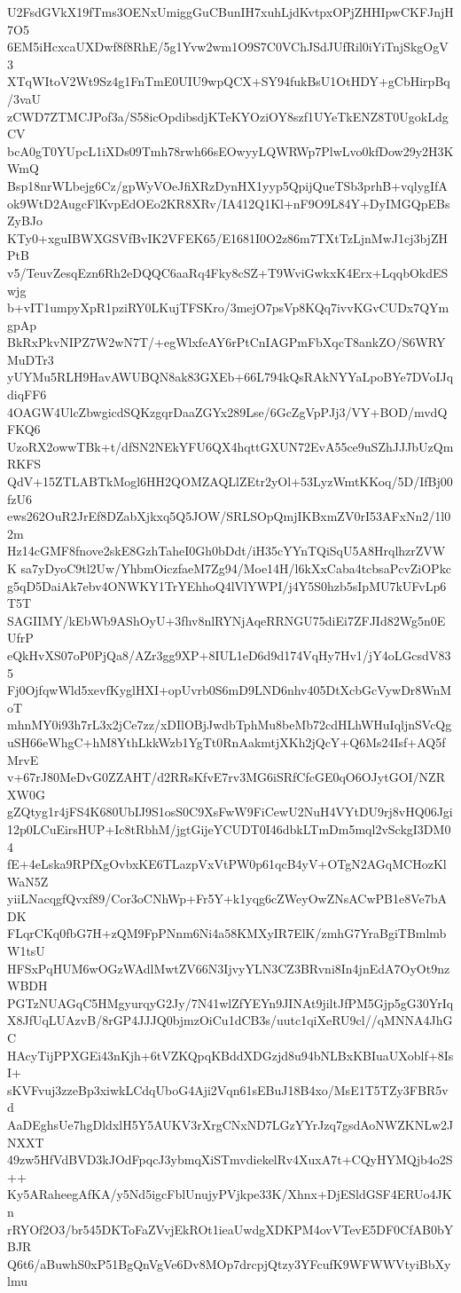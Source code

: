 U2FsdGVkX19fTms3OENxUmiggGuCBunIH7xuhLjdKvtpxOPjZHHIpwCKFJnjH7O5
6EM5iHcxcaUXDwf8f8RhE/5g1Yvw2wm1O9S7C0VChJSdJUfRil0iYiTnjSkgOgV3
XTqWItoV2Wt9Sz4g1FnTmE0UIU9wpQCX+SY94fukBsU1OtHDY+gCbHirpBq/3vaU
zCWD7ZTMCJPof3a/S58icOpdibsdjKTeKYOziOY8szf1UYeTkENZ8T0UgokLdgCV
bcA0gT0YUpcL1iXDs09Tmh78rwh66sEOwyyLQWRWp7PlwLvo0kfDow29y2H3KWmQ
Bsp18nrWLbejg6Cz/gpWyVOeJfiXRzDynHX1yyp5QpijQueTSb3prhB+vqlygIfA
ok9WtD2AugcFlKvpEdOEo2KR8XRv/IA412Q1Kl+nF9O9L84Y+DyIMGQpEBsZyBJo
KTy0+xguIBWXGSVfBvIK2VFEK65/E1681I0O2z86m7TXtTzLjnMwJ1cj3bjZHPtB
v5/TeuvZesqEzn6Rh2eDQQC6aaRq4Fky8cSZ+T9WviGwkxK4Erx+LqqbOkdESwjg
b+vIT1umpyXpR1pziRY0LKujTFSKro/3mejO7psVp8KQq7ivvKGvCUDx7QYmgpAp
BkRxPkvNIPZ7W2wN7T/+egWlxfeAY6rPtCnIAGPmFbXqcT8ankZO/S6WRYMuDTr3
yUYMu5RLH9HavAWUBQN8ak83GXEb+66L794kQsRAkNYYaLpoBYe7DVoIJqdiqFF6
4OAGW4UlcZbwgicdSQKzgqrDaaZGYx289Lse/6GcZgVpPJj3/VY+BOD/mvdQFKQ6
UzoRX2owwTBk+t/dfSN2NEkYFU6QX4hqttGXUN72EvA55ce9uSZhJJJbUzQmRKFS
QdV+15ZTLABTkMogl6HH2QOMZAQLlZEtr2yOl+53LyzWmtKKoq/5D/IfBj00fzU6
ews262OuR2JrEf8DZabXjkxq5Q5JOW/SRLSOpQmjIKBxmZV0rI53AFxNn2/1l02m
Hz14cGMF8fnove2skE8GzhTaheI0Gh0bDdt/iH35cYYnTQiSqU5A8HrqlhzrZVWK
sa7yDyoC9tl2Uw/YhbmOiczfaeM7Zg94/Moe14H/l6kXxCaba4tcbsaPcvZiOPkc
g5qD5DaiAk7ebv4ONWKY1TrYEhhoQ4lVlYWPI/j4Y5S0hzb5sIpMU7kUFvLp6T5T
SAGIIMY/kEbWb9AShOyU+3fhv8nlRYNjAqeRRNGU75diEi7ZFJId82Wg5n0EUfrP
eQkHvXS07oP0PjQa8/AZr3gg9XP+8IUL1eD6d9d174VqHy7Hv1/jY4oLGcsdV835
Fj0OjfqwWld5xevfKyglHXI+opUvrb0S6mD9LND6nhv405DtXcbGcVywDr8WnMoT
mhnMY0i93h7rL3x2jCe7zz/xDIlOBjJwdbTphMu8beMb72cdHLhWHuIqljnSVcQg
uSH66eWhgC+hM8YthLkkWzb1YgTt0RnAakmtjXKh2jQcY+Q6Ms24Isf+AQ5fMrvE
v+67rJ80MeDvG0ZZAHT/d2RRsKfvE7rv3MG6iSRfCfcGE0qO6OJytGOI/NZRXW0G
gZQtyg1r4jFS4K680UbIJ9S1osS0C9XsFwW9FiCewU2NuH4VYtDU9rj8vHQ06Jgi
12p0LCuEirsHUP+Ic8tRbhM/jgtGijeYCUDT0I46dbkLTmDm5mql2vSckgI3DM04
fE+4eLska9RPfXgOvbxKE6TLazpVxVtPW0p61qcB4yV+OTgN2AGqMCHozKlWaN5Z
yiiLNacqgfQvxf89/Cor3oCNhWp+Fr5Y+k1yqg6cZWeyOwZNsACwPB1e8Ve7bADK
FLqrCKq0fbG7H+zQM9FpPNnm6Ni4a58KMXyIR7ElK/zmhG7YraBgiTBmlmbW1tsU
HFSxPqHUM6wOGzWAdlMwtZV66N3IjvyYLN3CZ3BRvni8In4jnEdA7OyOt9nzWBDH
PGTzNUAGqC5HMgyurqyG2Jy/7N41wlZfYEYn9JINAt9jiltJfPM5Gjp5gG30YrIq
X8JfUqLUAzvB/8rGP4JJJQ0bjmzOiCu1dCB3s/uutc1qiXeRU9cl//qMNNA4JhGC
HAcyTijPPXGEi43nKjh+6tVZKQpqKBddXDGzjd8u94bNLBxKBIuaUXoblf+8IsI+
sKVFvuj3zzeBp3xiwkLCdqUboG4Aji2Vqn61sEBuJ18B4xo/MsE1T5TZy3FBR5vd
AaDEghsUe7hgDldxlH5Y5AUKV3rXrgCNxND7LGzYYrJzq7gsdAoNWZKNLw2JNXXT
49zw5HfVdBVD3kJOdFpqcJ3ybmqXiSTmvdiekelRv4XuxA7t+CQyHYMQjb4o2S++
Ky5ARaheegAfKA/y5Nd5igcFblUnujyPVjkpe33K/Xhnx+DjESldGSF4ERUo4JKn
rRYOf2O3/br545DKToFaZVvjEkROt1ieaUwdgXDKPM4ovVTevE5DF0CfAB0bYBJR
Q6t6/aBuwhS0xP51BgQnVgVe6Dv8MOp7drcpjQtzy3YFcufK9WFWWVtyiBbXylmu
